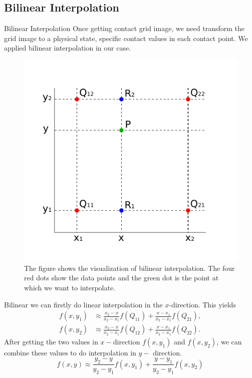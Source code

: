 \documentclass{beamer}
\begin{document}
\subsection{Bilinear Interpolation}
\begin{frame}{Bilinear Interpolation}
Once getting contact grid image, we need transform the grid image to a physical state, specific contact values in each contact point. We applied bilinear interpolation in our case.
\pause
\begin{figure}
        \centering
        \includegraphics[scale = 0.5]{../report/Figures/inp}
        \caption{The figure shows the visualization of bilinear interpolation. The four red dots show the data points and the green dot is the point at which we want to interpolate.}
\end{figure}
\end{frame}

\begin{frame}{Bilinear}
we can firstly do linear interpolation in the $x$-direction. This yields
\pause
\begin{subequations}
        \begin{align}
            f(x,y_{1})&\approx {\frac {x_{2}-x}{x_{2}-x_{1}}}f(Q_{11})+{\frac {x-x_{1}}{x_{2}-x_{1}}}f(Q_{21}),\\
            f(x,y_{2})&\approx {\frac {x_{2}-x}{x_{2}-x_{1}}}f(Q_{12})+{\frac {x-x_{1}}{x_{2}-x_{1}}}f(Q_{22}).
        \end{align}
        \label{eq:2}
\end{subequations}
\pause
After getting the two values in $x-$direction $f(x, y_1)$ and $f(x, y_2)$, we can combine these values to do interpolation in $y-$ direction.
\pause
\begin{equation}
        f(x,y) \approx {\frac {y_{2}-y}{y_{2}-y_{1}}}f(x,y_{1})+{\frac {y-y_{1}}{y_{2}-y_{1}}}f(x,y_{2})
    \end{equation}
\end{frame}
\end{document}
